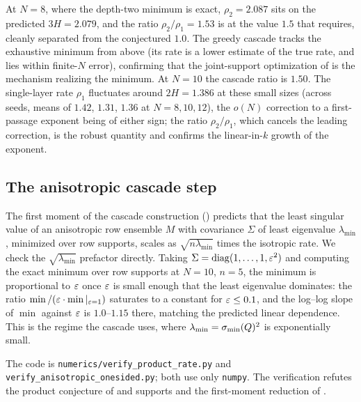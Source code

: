 At $N=8$, where the depth-two minimum is exact, $\rho_2=2.087$ sits on the predicted $3H=2.079$, and the
ratio $\rho_2/\rho_1=1.53$ is at the value $1.5$ that  requires, cleanly separated from
the conjectured $1.0$. The greedy cascade tracks the exhaustive minimum from above (its rate is a lower
estimate of the true rate, and lies within finite-$N$ error), confirming that the joint-support optimization of  is the mechanism realizing the
minimum. At $N=10$ the cascade ratio is $1.50$. The single-layer rate $\rho_1$ fluctuates around
$2H=1.386$ at these small sizes (across seeds, means of $1.42$, $1.31$, $1.36$ at $N=8,10,12$), the
$o(N)$ correction to a first-passage exponent being of either sign; the ratio $\rho_2/\rho_1$, which
cancels the leading correction, is the robust quantity and confirms the linear-in-$k$ growth of the
exponent.

\subsection{The anisotropic cascade step}
The first moment of the cascade construction () predicts that the least singular
value of an anisotropic row ensemble $M$ with covariance $\Sigma$ of least eigenvalue $\lambda_{\min}$,
minimized over row supports, scales as $\sqrt{n\lambda_{\min}}$ times the isotropic rate. We check the
$\sqrt{\lambda_{\min}}$ prefactor directly. Taking $\Sigma=\operatorname{diag}(1,\dots,1,\varepsilon^2)$ and computing the
exact minimum over row supports at $N=10$, $n=5$, the minimum is proportional to $\varepsilon$ once $\varepsilon$ is
small enough that the least eigenvalue dominates: the ratio $\min/(\varepsilon\cdot\min|_{\varepsilon=1})$ saturates to
a constant for $\varepsilon\le 0.1$, and the log--log slope of $\min$ against $\varepsilon$ is $1.0$--$1.15$ there,
matching the predicted linear dependence. This is the regime the cascade uses, where
$\lambda_{\min}=\sigma_{\min}(Q)^2$ is exponentially small.

The code is \texttt{numerics/verify\_product\_rate.py} and \texttt{verify\_anisotropic\_onesided.py};
both use only \texttt{numpy}. The verification refutes the product conjecture of \cite{shmaloProducts}
and supports  and the first-moment reduction of .
